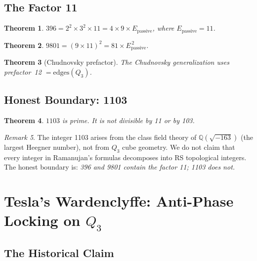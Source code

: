 \documentclass[11pt]{article}
\def\leanverified{}
\theoremstyle{plain}
\newtheorem{theorem}{Theorem}[section]
\theoremstyle{definition}
\theoremstyle{remark}
\newtheorem{remark}[theorem]{Remark}
\newcommand{\leanverified}{\textsuperscript{\textnormal{[\textsc{Lean}]}}}
\newcommand{\QQ}{\mathbb{Q}}
\begin{document}
\subsection{The Factor 11}

\begin{theorem}\leanverified\label{thm:396}
$396 = 2^2 \times 3^2 \times 11 = 4 \times 9 \times E_{\mathrm{passive}}$,
where $E_{\mathrm{passive}} = 11$.
\end{theorem}

\begin{theorem}\leanverified\label{thm:9801}
$9801 = (9 \times 11)^2 = 81 \times E_{\mathrm{passive}}^{\,2}$.
\end{theorem}

\begin{theorem}[Chudnovsky prefactor]\leanverified
The Chudnovsky generalization uses prefactor~12 $= \mathrm{edges}(Q_3)$.
\end{theorem}

\subsection{Honest Boundary: 1103}

\begin{theorem}\leanverified\label{thm:1103}
$1103$ is prime. It is not divisible by 11 or by 103.
\end{theorem}

\begin{remark}
The integer 1103 arises from the class field theory of $\QQ(\sqrt{-163})$
(the largest Heegner number), not from $Q_3$ cube geometry.
We do not claim that every integer in Ramanujan's formulas decomposes
into RS topological integers. The honest boundary is:
\emph{396 and 9801 contain the factor 11; 1103 does not.}
\end{remark}

\section{Tesla's Wardenclyffe: Anti-Phase Locking on $Q_3$}
\label{sec:wardenclyffe}

\subsection{The Historical Claim}
\end{document}
